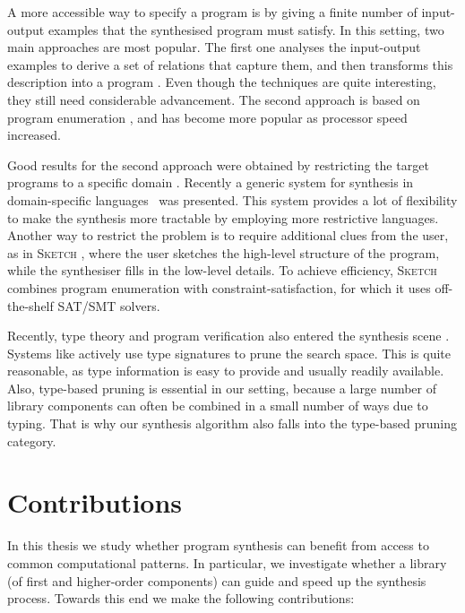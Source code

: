 A more accessible way to specify a program is by giving a finite number of input-output examples that the synthesised program must satisfy.  In this setting, two main approaches are most popular.  The first one analyses the input-output examples to derive a set of relations that capture them, and then transforms this description into a program \cite{Summers:1977:MLP:321992.322002,Kitzelmann:2009:AIF:1530575.1530582,Jha:2010:OCP:1806799.1806833}.  Even though the techniques are quite interesting, they still need considerable advancement.  The second approach is based on program enumeration \cite{LambdaSquarePaper,EscherPaper,MythPaper}, and has become more popular as processor speed increased.

Good results for the second approach were obtained by restricting the target programs to a specific domain \cite{Gulwani:2011:ASP:1926385.1926423,Gulwani:2011:SGC:1993498.1993505}. Recently a generic system for synthesis in domain-specific languages~\cite{Perelman:2014:TS:2594291.2594297} was presented.  This system provides a lot of flexibility to make the synthesis more tractable by employing more restrictive languages.  Another way to restrict the problem is to require additional clues from the user, as in \textsc{Sketch} \cite{Solar-Lezama:2006:CSF:1168857.1168907}, where the user sketches the high-level structure of the program, while the synthesiser fills in the low-level details.  To achieve efficiency, \textsc{Sketch} combines program enumeration with constraint-satisfaction, for which it uses off-the-shelf SAT/SMT solvers.

Recently, type theory and program verification also entered the synthesis scene \cite{LeonPaper,DBLP:journals/corr/InalaQLS15,Kuncak:2010:CFS:1806596.1806632,Frankle:2016:EST:2837614.2837629}.  Systems like \cite{LambdaSquarePaper,MythPaper,SynquidPaper} actively use type signatures to prune the search space.  This is quite reasonable, as type information is easy to provide and usually readily available.  Also, type-based pruning is essential in our setting, because a large number of library components can often be combined in a small number of ways due to typing.  That is why our synthesis algorithm also falls into the type-based pruning category.

\section{Contributions}
In this thesis we study whether program synthesis can benefit from access to common computational patterns.  In particular, we investigate whether a library (of first and higher-order components) can guide and speed up the synthesis process.  Towards this end we make the following contributions:

